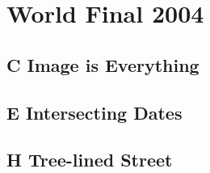 \section{World Final 2004}
\subsection{C Image is Everything}
\raggedbottom
\hrulefill
\subsection{E Intersecting Dates}
\raggedbottom
\hrulefill
\subsection{H Tree-lined Street}
\raggedbottom
\hrulefill

